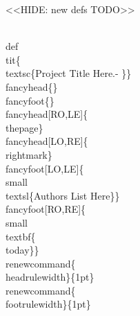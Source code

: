 \documentclass[11pt]{article}
\begin{document}
<<HIDE: new defs TODO>>

\\def\\tit\{\\textsc\{Project Title Here.- \}\}
\\fancyhead\{\} %
\\fancyfoot\{\} %
\\fancyhead[RO,LE]\{\\thepage\}
\\fancyhead[LO,RE]\{\\rightmark\}
\\fancyfoot[LO,LE]\{\\small\\textsl\{Authors List Here\}\}
\\fancyfoot[RO,RE]\{\\small\\textbf\{\\today\}\}
\\renewcommand\{\\headrulewidth\}\{1pt\}
\\renewcommand\{\\footrulewidth\}\{1pt\}
\end{document}
